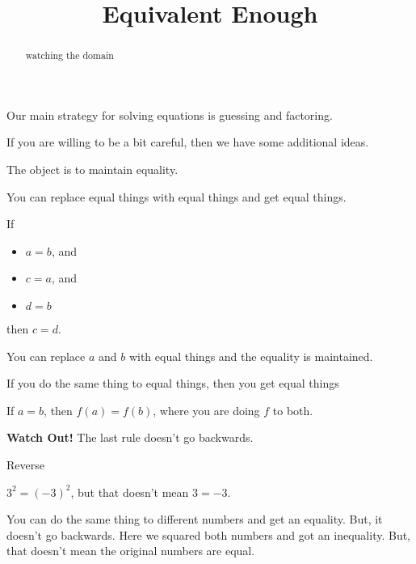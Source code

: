 \documentclass{ximera}
\title{Equivalent Enough}
\begin{document}
\begin{abstract}
watching the domain
\end{abstract}
\maketitle





Our main strategy for solving equations is guessing and factoring.




If you are willing to be a bit careful, then we have some additional ideas.

The object is to maintain equality.



\begin{observation}


You can replace equal things with equal things and get equal things.


If 
\begin{itemize}
\item $a=b$, and
\item $c=a$, and
\item $d=b$
\end{itemize}
then $c=d$.

You can replace $a$ and $b$ with equal things and the equality is maintained.


\end{observation}





\begin{observation}


If you do the same thing to equal things, then you get equal things


If $a=b$, then $f(a) = f(b)$, where you are doing $f$ to both.



\end{observation}




\textbf{Watch Out!} The last rule doesn't go backwards.




\begin{example}  Reverse

$3^2 = (-3)^2$, but that doesn't mean $3=-3$.


You can do the same thing to different numbers and get an equality.  But, it doesn't go backwards.  Here we squared both numbers and got an inequality.  But, that doesn't mean the original numbers are equal.


\end{example}
\end{document}
